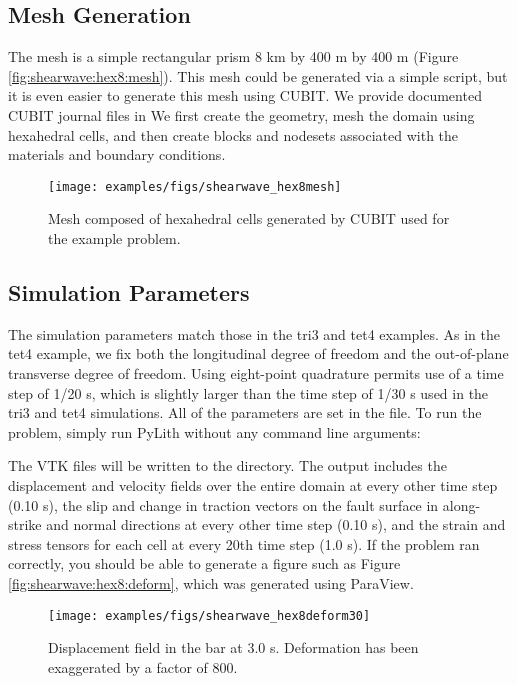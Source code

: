 \subsection{Mesh Generation}

The mesh is a simple rectangular prism 8 km by 400 m by 400 m (Figure
\vref{fig:shearwave:hex8:mesh}). This mesh could be generated via
a simple script, but it is even easier to generate this mesh using
CUBIT. We provide documented CUBIT journal files in 
We first create the geometry, mesh the domain using hexahedral cells,
and then create blocks and nodesets associated with the materials
and boundary conditions.

\begin{figure}
  \texttt{[image: examples/figs/shearwave\_hex8mesh]}
  \caption{Mesh composed of hexahedral cells generated by CUBIT used for the
    example problem.}
  \label{fig:shearwave:hex8:mesh}
\end{figure}


\subsection{Simulation Parameters}

The simulation parameters match those in the tri3 and tet4 examples.
As in the tet4 example, we fix both the longitudinal degree of freedom
and the out-of-plane transverse degree of freedom. Using eight-point
quadrature permits use of a time step of 1/20 s, which is slightly
larger than the time step of 1/30 s used in the tri3 and tet4 simulations.
All of the parameters are set in the  file.
To run the problem, simply run PyLith without any command line arguments:
The VTK files will be written to the  directory. The
output includes the displacement and velocity fields over the entire
domain at every other time step (0.10 s), the slip and change in traction
vectors on the fault surface in along-strike and normal directions
at every other time step (0.10 s), and the strain and stress tensors
for each cell at every 20th time step (1.0 s). If the problem ran
correctly, you should be able to generate a figure such as Figure
\vref{fig:shearwave:hex8:deform}, which was generated using ParaView.

\begin{figure}
  \texttt{[image: examples/figs/shearwave\_hex8deform30]}
  \caption{Displacement field in the bar at 3.0 s. Deformation has been exaggerated
    by a factor of 800.}
  \label{fig:shearwave:hex8:deform}
\end{figure}


